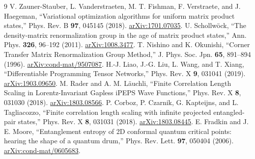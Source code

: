 \documentclass[11pt]{article}
\begin{document}
\begin{thebibliography}{9}
 V. Zauner-Stauber, L. Vanderstraeten, M. T. Fishman,
F. Verstraete, and J. Haegeman, ``Variational optimization algorithms for
uniform matrix product states,'' Phys. Rev. B \textbf{97}, 045145 (2018).
\href{https://arxiv.org/abs/1701.07035}{arXiv:1701.07035}.
 U. Schollw\"ock, ``The density-matrix renormalization group
in the age of matrix product states,'' Ann. Phys. \textbf{326}, 96--192 (2011).
\href{https://arxiv.org/abs/1008.3477}{arXiv:1008.3477}.
 T. Nishino and K. Okunishi, ``Corner Transfer Matrix
Renormalization Group Method,'' J. Phys. Soc. Jpn. \textbf{65}, 891--894 (1996).
\href{https://arxiv.org/abs/cond-mat/9507087}{arXiv:cond-mat/9507087}.
 H.-J. Liao, J.-G. Liu, L. Wang, and T. Xiang,
``Differentiable Programming Tensor Networks,'' Phys. Rev. X \textbf{9},
031041 (2019). \href{https://arxiv.org/abs/1903.09650}{arXiv:1903.09650}.
 M. Rader and A. M. L\"auchli, ``Finite Correlation Length
Scaling in Lorentz-Invariant Gapless iPEPS Wave Functions,'' Phys. Rev. X
\textbf{8}, 031030 (2018).
\href{https://arxiv.org/abs/1803.08566}{arXiv:1803.08566}.
 P. Corboz, P. Czarnik, G. Kapteijns, and L. Tagliacozzo,
``Finite correlation length scaling with infinite projected entangled-pair
states,'' Phys. Rev. X \textbf{8}, 031031 (2018).
\href{https://arxiv.org/abs/1803.08445}{arXiv:1803.08445}.
 E. Fradkin and J. E. Moore, ``Entanglement entropy of 2D
conformal quantum critical points: hearing the shape of a quantum drum,''
Phys. Rev. Lett. \textbf{97}, 050404 (2006).
\href{https://arxiv.org/abs/cond-mat/0605683}{arXiv:cond-mat/0605683}.
\end{thebibliography}
\end{document}
